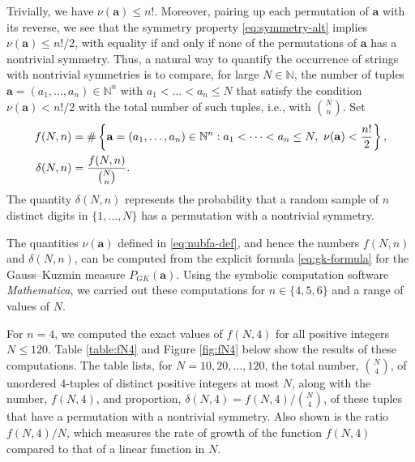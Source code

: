 \documentclass[10pt]{article}
\theoremstyle{definition}
\numberwithin{equation}{section}
\numberwithin{lemma}{section}
\newcommand{\NN}{\mathbb{N}}
\newcommand{\bfa}{\mathbf{a}}
\begin{document}
Trivially, we have $\nu(\bfa)\le n!$. Moreover, pairing up each
permutation of $\bfa$ with its reverse, we see that the symmetry property
\eqref{eq:symmetry-alt}
implies  $\nu(\bfa)\le n!/2$, 
with equality if and only if none 
of the permutations of $\bfa$ has a nontrivial symmetry.  Thus, a
natural way to quantify the occurrence of strings with nontrivial
symmetries is to compare, for large $N\in\NN$,
the number of tuples $\bfa=(a_1,\dots,a_n)\in\NN^n$ with 
$a_1<\dots<a_n\le N$ that satisfy the condition $\nu(\bfa)<n!/2$
with the total number of such tuples, i.e., with $\binom{N}{n}$. 
Set
\begin{align}
\notag
f(N,n)&=\#\left\{
\bfa=(a_1,\dots,a_n)\in\NN^n: a_1<\dots<a_n\le N, 
\ \nu(\bfa)<\frac{n!}{2} \right\},
\\
\notag
\delta(N,n)&=\frac{f(N,n)}{\binom{N}{n}}.
\end{align}
The quantity $\delta(N,n)$ represents the probability
that a random sample of $n$ distinct digits in $\{1,\dots,N\}$ 
has a permutation with a nontrivial symmetry.

The quantities $\nu(\bfa)$ defined in \eqref{eq:nubfa-def}, and hence
the numbers $f(N,n)$ and $\delta(N,n)$, 
can be computed from the explicit formula
\eqref{eq:gk-formula} for the Gauss--Kuzmin measure $P_{GK}(\bfa)$.
Using the symbolic computation software \emph{Mathematica}, we
carried out these computations for $n\in\{4,5,6\}$ and a range of values
of $N$.  

For $n=4$, we computed the exact values of $f(N,4)$ for all positive
integers $N\le 120$.  Table \ref{table:fN4} and Figure \ref{fig:fN4} 
below show the results of these computations.  The table lists, for
$N=10,20,\dots,120$, the total number, $\binom{N}{4}$, of unordered
$4$-tuples of distinct positive integers at most $N$, along with the number,
$f(N,4)$, and proportion, $\delta(N,4)=f(N,4)/\binom{N}{4}$, of these
tuples that have a permutation with a nontrivial symmetry.  Also shown
is the ratio $f(N,4)/N$, which measures the rate of growth of the
function $f(N,4)$ compared to that of a linear function in $N$.
\end{document}
